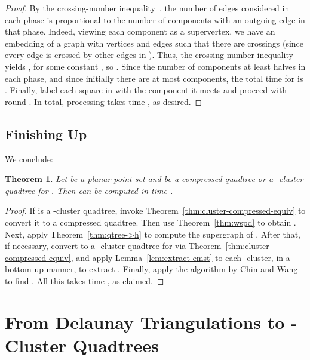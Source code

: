 \documentclass[11pt]{paper}
\newtheorem {theorem} {Theorem}[section]
\begin{document}
\begin{proof}
  By the crossing-number inequality~\cite[Theorem~4.3.1]{Matousek02}, the 
  number of edges considered in
  each phase is proportional to the number  of components with an outgoing
  edge in that phase. Indeed, viewing each component as a supervertex,
  we have an embedding of a graph with  vertices and  edges such
  that there are  crossings (since every edge  is crossed
  by  other edges in ). Thus, the crossing number
  inequality yields , 
  for some
  constant , so .  Since the number of
  components at least halves in each phase, and since initially there
  are at most  components, the total time
  for  is . Finally, label each
  square in  with the component  it meets and proceed
  with round .
  In total, processing  takes time , as desired.
\end{proof}

\subsection{Finishing Up}
We conclude:
\begin {theorem} \label {thm:wspd->dt}
Let  be a planar point set and  be a compressed quadtree 
or a -cluster quadtree 
for .  Then  can be computed in time .
\end {theorem}

\begin{proof}
If  is a -cluster quadtree, invoke 
Theorem~\ref{thm:cluster-compressed-equiv} to convert it
to a compressed quadtree.
Then use Theorem~\ref{thm:wspd} to obtain .
Next, apply Theorem~\ref{thm:qtree->h} to compute the
supergraph  of . After that, if necessary, convert  to a 
-cluster quadtree for  via Theorem~\ref{thm:cluster-compressed-equiv},
and apply Lemma~\ref{lem:extract-emst} to each -cluster, in a bottom-up
manner, to extract . Finally, apply the algorithm
by Chin and Wang~\cite{ChinWa99} to find .
All this takes time , as claimed.
\end{proof}



















\section {From Delaunay Triangulations to -Cluster Quadtrees}
\label {sec:dt->qt}
\end{document}
